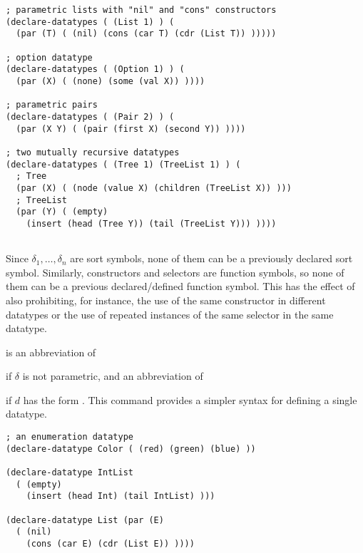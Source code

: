 \begin{description}
\begin{lstlisting}[linewidth=37em]
; parametric lists with "nil" and "cons" constructors
(declare-datatypes ( (List 1) ) (
  (par (T) ( (nil) (cons (car T) (cdr (List T)) )))))

; option datatype
(declare-datatypes ( (Option 1) ) (
  (par (X) ( (none) (some (val X)) ))))

; parametric pairs
(declare-datatypes ( (Pair 2) ) (
  (par (X Y) ( (pair (first X) (second Y)) ))))
  
; two mutually recursive datatypes
(declare-datatypes ( (Tree 1) (TreeList 1) ) (
  ; Tree
  (par (X) ( (node (value X) (children (TreeList X)) )))
  ; TreeList
  (par (Y) ( (empty) 
    (insert (head (Tree Y)) (tail (TreeList Y))) ))))
    
\end{lstlisting}

Since $\delta_1, \ldots, \delta_n$ are sort symbols, 
none of them can be a previously declared sort symbol.
Similarly, constructors and selectors are function symbols,
so none of them can be a previous declared/defined function symbol.
This has the effect of also prohibiting, for instance, the use 
of the same constructor in different datatypes or the use 
of repeated instances of the same selector in the same datatype.
\smallskip

%
\item[\expr{ 
(declare-datatype $\delta$ $d$)}] is an abbreviation of 
\begin{center}
\end{center}
if $\delta$ is not parametric, and an abbreviation of 
\begin{center}
\end{center}
if $d$ has the form .
This command provides a simpler syntax for defining a single datatype.

\begin{lstlisting}[linewidth=37em]
; an enumeration datatype
(declare-datatype Color ( (red) (green) (blue) ))

(declare-datatype IntList 
  ( (empty) 
    (insert (head Int) (tail IntList) )))

(declare-datatype List (par (E)
  ( (nil) 
    (cons (car E) (cdr (List E)) ))))


\end{lstlisting}
\end{description}
